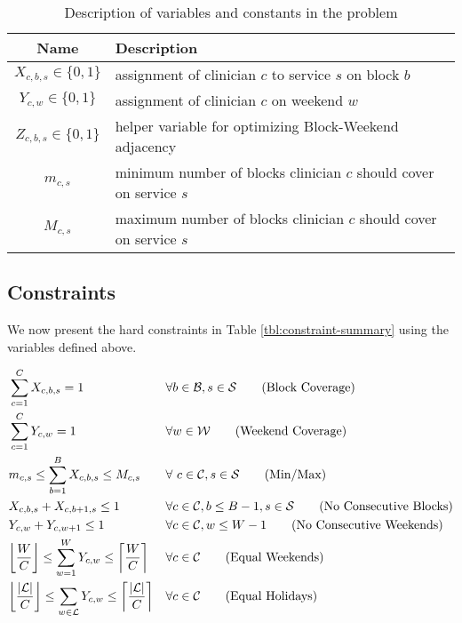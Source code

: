 \begin{table}[h]
	\centering
	\begin{tabular}{ c l }
		\hline
		\textbf{Name}              & \textbf{Description}                                               \\ \hline
		$X_{c, b, s} \in \{0, 1\}$ & assignment of clinician $c$ to service $s$ on block $b$            \\
		$Y_{c, w} \in \{0, 1\}$    & assignment of clinician $c$ on weekend $w$                         \\
		$Z_{c, b, s} \in \{0, 1\}$ & helper variable for optimizing Block-Weekend adjacency             \\
		$m_{c, s}$                 & minimum number of blocks clinician $c$ should cover on service $s$ \\
		$M_{c, s}$                 & maximum number of blocks clinician $c$ should cover on service $s$
	\end{tabular}
	\caption{Description of variables and constants in the problem}
	\label{tbl:variables-constants}
\end{table}

\subsection{Constraints} \label{sec:meth-constraints}
We now present the hard constraints in Table \ref{tbl:constraint-summary} using the variables defined above.

\begin{align}
	&\sum_{c=1}^{C} X_{c, b, s} = 1 &&\forall b\in \mathcal{B}, s \in \mathcal{S} \tag{Block Coverage} \label{eqn:constr-block-cov} \\
	&\sum_{c=1}^{C} Y_{c, w} = 1 &&\forall w\in \mathcal{W} \tag{Weekend Coverage} \label{eqn:constr-weekend-cov} \\
	&m_{c, s} \leq \sum_{b=1}^{B} X_{c, b, s} \leq M_{c, s} &&\forall\ c\in\mathcal{C}, s\in\mathcal{S} \tag{Min/Max} \label{eqn:constr-min-max} \\
	&X_{c, b, s} + X_{c, b + 1, s} \leq 1 &&\forall c\in\mathcal{C}, b \leq B - 1, s\in\mathcal{S} \tag{No Consecutive Blocks} \label{eqn:constr-no-consec-blocks} \\
	&Y_{c, w} + Y_{c, w + 1} \leq 1 &&\forall c\in\mathcal{C}, w \leq W - 1 \tag{No Consecutive Weekends} \label{eqn:constr-no-consec-weekends} \\
	&\floor*{\frac{W}{C}} \leq \sum_{w=1}^W Y_{c, w} \leq \ceil*{\frac{W}{C}} &&\forall c\in\mathcal{C} \tag{Equal Weekends} \label{eqn:constr-equal-weekends} \\
	&\floor*{\frac{\abs{\mathcal{L}}}{C}} \leq \sum_{w\in\mathcal{L}} Y_{c, w} \leq \ceil*{\frac{\abs{\mathcal{L}}}{C}} &&\forall c\in\mathcal{C} \tag{Equal Holidays} \label{eqn:constr-equal-holidays}
\end{align}

